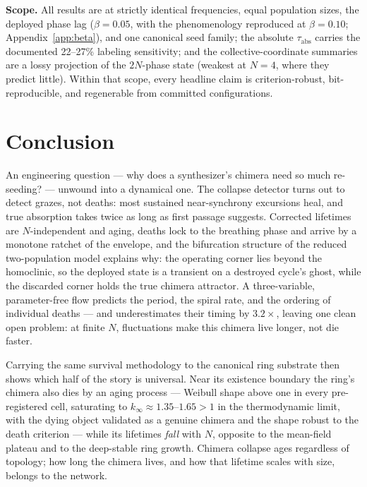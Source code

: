 \documentclass[pdflatex,sn-mathphys,Numbered]{sn-jnl}
\begin{document}
\textbf{Scope.} All results are at strictly identical frequencies, equal population
sizes, the deployed phase lag ($\beta = 0.05$, with the phenomenology reproduced at
$\beta = 0.10$; Appendix~\ref{app:beta}), and one canonical seed family; the absolute
$\tau_{\mathrm{abs}}$ carries the documented 22--27\% labeling sensitivity; and the
collective-coordinate summaries are a lossy projection of the $2N$-phase state
(weakest at $N = 4$, where they predict little). Within that scope, every headline
claim is criterion-robust, bit-reproducible, and regenerable from committed
configurations.

\section{Conclusion}\label{sec:conclusion}

An engineering question --- why does a synthesizer's chimera need so much
re-seeding? --- unwound into a dynamical one. The collapse detector turns out to
detect grazes, not deaths: most sustained near-synchrony excursions heal, and true
absorption takes twice as long as first passage suggests. Corrected lifetimes are
$N$-independent and aging, deaths lock to the breathing phase and arrive by a
monotone ratchet of the envelope, and the bifurcation structure of the reduced
two-population model explains why: the operating corner lies beyond the homoclinic,
so the deployed state is a transient on a destroyed cycle's ghost, while the
discarded corner holds the true chimera attractor. A three-variable, parameter-free
flow predicts the period, the spiral rate, and the ordering of individual deaths
--- and underestimates their timing by $3.2\times$, leaving one clean open problem:
at finite $N$, fluctuations make this chimera live longer, not die faster.

Carrying the same survival methodology to the canonical ring substrate then shows
which half of the story is universal. Near its existence boundary the ring's
chimera also dies by an aging process --- Weibull shape above one in every
pre-registered cell, saturating to $k_\infty \approx 1.35$--$1.65 > 1$ in the
thermodynamic limit, with the dying object validated as a genuine chimera and the
shape robust to the death criterion --- while its lifetimes \emph{fall} with $N$,
opposite to the mean-field plateau and to the deep-stable ring growth. Chimera
collapse ages regardless of topology; how long the chimera lives, and how that
lifetime scales with size, belongs to the network.
\end{document}

